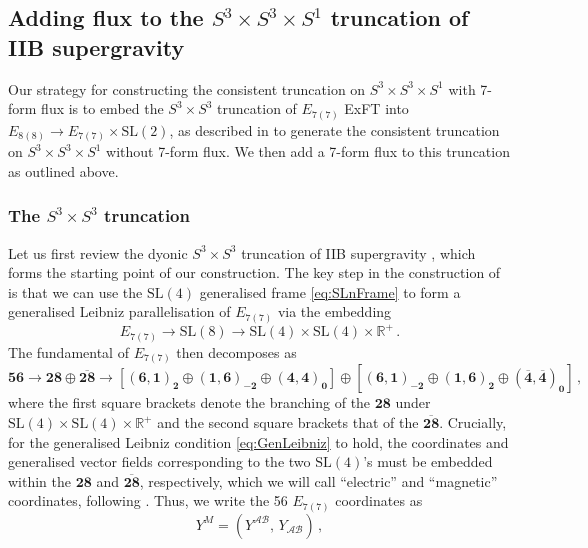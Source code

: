 \documentclass[a4paper, 11pt]{article}
\numberwithin{equation}{section}
\newcommand{\SL}[1]{\mathrm{SL}( #1 )}
\newcommand{\EE}{\ensuremath{E_{8(8)}}\xspace}
\newcommand{\En}[1]{E_{#1(#1)}}
\newcommand{\+}{\oplus}
\newcommand{\cA}{\mathcal{A}}
\newcommand{\cB}{\mathcal{B}}
\begin{document}
\subsection{Adding flux to the $S^3 \times S^3 \times S^1$ truncation of IIB supergravity}
Our strategy for constructing the consistent truncation on $S^3 \times S^3 \times S^1$ with 7-form flux is to embed the $S^3 \times S^3$ truncation of $\En{7}$ ExFT \cite{Inverso:2017lrz} into $\EE \rightarrow \En{7} \times \SL{2}$, as described in \cite{Galli:2022idq} to generate the consistent truncation on $S^3 \times S^3 \times S^1$ without 7-form flux. We then add a 7-form flux to this truncation as outlined above.

\subsubsection{The $S^3 \times S^3$ truncation} \label{s:S3S3}
Let us first review the dyonic $S^3 \times S^3$ truncation of IIB supergravity \cite{Inverso:2017lrz}, which forms the starting point of our construction. The key step in the construction of \cite{Inverso:2017lrz} is that we can use the $\SL{4}$ generalised frame \eqref{eq:SLnFrame} to form a generalised Leibniz parallelisation of $\En{7}$ via the embedding
\begin{equation}
	\En{7} \rightarrow \SL{8} \rightarrow \SL{4} \times \SL{4} \times \mathbb{R}^+ \,.
\end{equation}
The fundamental of $\En{7}$ then decomposes as
\begin{equation}
	\mathbf{56} \rightarrow \mathbf{28} \oplus \overline{\mathbf{28}} \rightarrow \left[ \mathbf{\left(6,1\right)_2} \oplus \mathbf{\left(1,6\right)_{-2}} \oplus \mathbf{\left(4,4\right)_0} \right] \oplus \left[ \mathbf{\left(6,1\right)_{-2}} \oplus \mathbf{\left(1,6\right)_{2}} \oplus \mathbf{\left(\overline{4},\overline{4}\right)_0} \right] \,,
\end{equation}
where the first square brackets denote the branching of the $\mathbf{28}$ under $\SL{4} \times \SL{4} \times \mathbb{R}^+$ and the second square brackets that of the $\mathbf{\overline{28}}$. Crucially, for the generalised Leibniz condition \eqref{eq:GenLeibniz} to hold, the coordinates and generalised vector fields corresponding to the two $\SL{4}$'s must be embedded within the $\mathbf{28}$ and $\mathbf{\overline{28}}$, respectively, which we will call ``electric'' and ``magnetic'' coordinates, following \cite{Inverso:2017lrz}. Thus, we write the 56 $\En{7}$ coordinates as
\begin{equation}
	Y^M = \left( Y^{\cA\cB} ,\, Y_{\cA\cB} \right) \,,
\end{equation}
\end{document}
